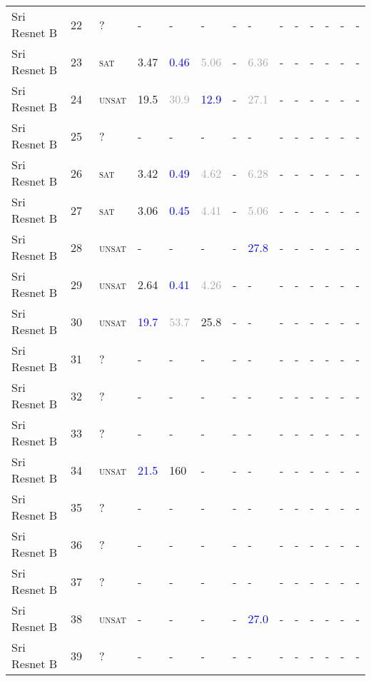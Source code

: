 \begin{center}
{\begin{longtable}{@{}llllllllllllll@{}}
Sri Resnet B & 22 & ~? & - & - & - & - & - & - & - & - & - & - & - \\
Sri Resnet B & 23 & ~\textsc{sat} & \textcolor{second}{3.47} & \textcolor{blue}{0.46} & \textcolor{darkgray}{5.06} & - & \textcolor{darkgray}{6.36} & - & - & - & - & - & - \\
Sri Resnet B & 24 & ~\textsc{unsat} & \textcolor{second}{19.5} & \textcolor{darkgray}{30.9} & \textcolor{blue}{12.9} & - & \textcolor{darkgray}{27.1} & - & - & - & - & - & - \\
Sri Resnet B & 25 & ~? & - & - & - & - & - & - & - & - & - & - & - \\
Sri Resnet B & 26 & ~\textsc{sat} & \textcolor{second}{3.42} & \textcolor{blue}{0.49} & \textcolor{darkgray}{4.62} & - & \textcolor{darkgray}{6.28} & - & - & - & - & - & - \\
Sri Resnet B & 27 & ~\textsc{sat} & \textcolor{second}{3.06} & \textcolor{blue}{0.45} & \textcolor{darkgray}{4.41} & - & \textcolor{darkgray}{5.06} & - & - & - & - & - & - \\
Sri Resnet B & 28 & ~\textsc{unsat} & - & - & - & - & \textcolor{blue}{27.8} & - & - & - & - & - & - \\
Sri Resnet B & 29 & ~\textsc{unsat} & \textcolor{second}{2.64} & \textcolor{blue}{0.41} & \textcolor{darkgray}{4.26} & - & - & - & - & - & - & - & - \\
Sri Resnet B & 30 & ~\textsc{unsat} & \textcolor{blue}{19.7} & \textcolor{darkgray}{53.7} & \textcolor{second}{25.8} & - & - & - & - & - & - & - & - \\
Sri Resnet B & 31 & ~? & - & - & - & - & - & - & - & - & - & - & - \\
Sri Resnet B & 32 & ~? & - & - & - & - & - & - & - & - & - & - & - \\
Sri Resnet B & 33 & ~? & - & - & - & - & - & - & - & - & - & - & - \\
Sri Resnet B & 34 & ~\textsc{unsat} & \textcolor{blue}{21.5} & \textcolor{second}{160} & - & - & - & - & - & - & - & - & - \\
Sri Resnet B & 35 & ~? & - & - & - & - & - & - & - & - & - & - & - \\
Sri Resnet B & 36 & ~? & - & - & - & - & - & - & - & - & - & - & - \\
Sri Resnet B & 37 & ~? & - & - & - & - & - & - & - & - & - & - & - \\
Sri Resnet B & 38 & ~\textsc{unsat} & - & - & - & - & \textcolor{blue}{27.0} & - & - & - & - & - & - \\
Sri Resnet B & 39 & ~? & - & - & - & - & - & - & - & - & - & - & - \\

\end{longtable}}
\end{center}
